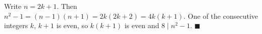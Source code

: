 Write $n=2k+1$. Then $n^2-1=(n-1)(n+1)=2k(2k+2)=4k(k+1)$. One of the consecutive integers $k$, $k+1$ is even, so $k(k+1)$ is even and $8\mid n^2-1$. $\blacksquare$
